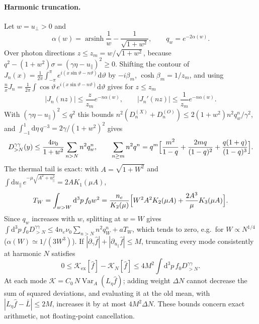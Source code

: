 \documentclass[11pt,a4paper]{article}
\numberwithin{equation}{section}
\newcommand{\dd}{\mathrm{d}}
\newcommand{\upar}{u_\parallel}
\newcommand{\uperp}{u_\perp}
\newcommand{\fh}{\hat f}
\newcommand{\arsinh}{\operatorname{arsinh}}
\newcommand{\Kex}{\mathcal K_{\mathrm{ex}}}
\begin{document}
\paragraph{Harmonic truncation.} Let $w=\uperp>0$ and
\begin{equation}
\alpha(w)=\arsinh\frac1w-\frac1{\sqrt{1+w^2}},\qquad q_w=e^{-2\alpha(w)} .
\end{equation}
Over photon directions $z\le z_m=w/\sqrt{1+w^2}$, because
$q^2-(1+w^2)\sigma=(\gamma\eta-\upar)^2\ge0$. Shifting the contour of
$J_n(x)=\frac1{2\pi}\int_{-\pi}^{\pi}e^{i(x\sin\vartheta-n\vartheta)}\dd\vartheta$ by
$-i\beta_m$, $\cosh\beta_m=1/z_m$, and using
$\frac nxJ_n=\frac1{2\pi}\int\cos\vartheta\,e^{i(x\sin\vartheta-n\vartheta)}\dd\vartheta$ gives
for $z\le z_m$
\begin{equation}
|J_n(nz)|\le\frac{z}{z_m}e^{-n\alpha(w)},\qquad |J_n'(nz)|\le\frac{1}{z_m}e^{-n\alpha(w)} .
\end{equation}
With $(\gamma\eta-\upar)^2\le q^2$ this bounds
$n^2(D_n^{(X)}+D_n^{(O)})\le2(1+w^2)n^2q_w^n/\gamma^2$, and
$\int_{-1}^1\dd\eta\,q^{-3}=2\gamma/(1+w^2)^2$ gives
\begin{equation}
D^{\gamma\gamma}_{>N}(y)\le\frac{4\nu_0}{1+w^2}\sum_{n>N}n^2q_w^n,\qquad
\sum_{n\ge m}n^2q^n=q^m\Bigl[\frac{m^2}{1-q}+\frac{2mq}{(1-q)^2}+\frac{q(1+q)}{(1-q)^3}\Bigr].
\label{eq:tail}
\end{equation}
The thermal tail is exact: with $A=\sqrt{1+W^2}$ and
$\int\dd\upar\,e^{-\mu\sqrt{A^2+\upar^2}}=2AK_1(\mu A)$,
\begin{equation}
T_W=\int_{w>W}\dd^3p\,f_0w^2=\frac{n_e}{K_2(\mu)}\Bigl[W^2A^2K_2(\mu A)+\frac{2A^3}{\mu}K_3(\mu A)\Bigr].
\end{equation}
Since $q_w$ increases with $w$, splitting at $w=W$ gives
$\int\dd^3p\,f_0D^{\gamma\gamma}_{>N}\le4n_e\nu_0\sum_{n>N}n^2q_W^n+aT_W$, which
tends to zero, e.g.\ for $W\propto N^{1/4}$ ($\alpha(W)\simeq1/(3W^3)$). If
$|\partial_\gamma\fh|+|\partial_{\upar}\fh|\le M$, truncating every mode
consistently at harmonic $N$ satisfies
\begin{equation}
0\le\Kex[\fh]-\mathcal K_N[\fh]\le4M^2\int\dd^3p\,f_0D^{\gamma\gamma}_{>N}.
\end{equation}
At each mode $\mathcal K=C_0\,N\operatorname{Var}_A(L_\eta\fh)$; adding weight
$\Delta N$ cannot decrease the sum of squared deviations, and evaluating it at
the old mean, with $|L_\eta\fh-\bar L|\le2M$, increases it by at most
$4M^2\Delta N$. These bounds concern exact arithmetic, not floating-point
cancellation.
\end{document}
